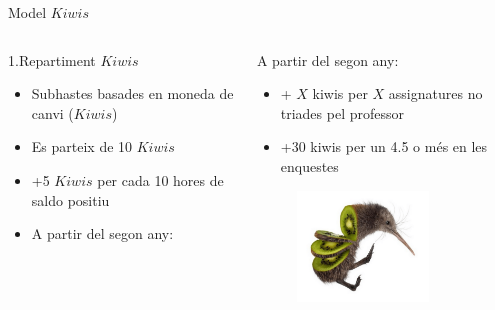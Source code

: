 \documentclass[twocolumn]{beamer}
\begin{document}
\begin{frame}{Model $Kiwis$}
\begin{columns}[t]
	\begin{column}{.5\textwidth}
		\begin{block}{1.Repartiment $Kiwis$}
			\begin{itemize}
				\item Subhastes basades en moneda de canvi ($Kiwis$)
				\item Es parteix de 10 $Kiwis$
				\item +5 $Kiwis$ per cada 10 hores de saldo positiu
				\item A partir del segon any:
			\end{itemize}
		\end{block}
	\end{column}
	\begin{column}{.5\textwidth}
		\begin{block}{A partir del segon any:}
			\begin{itemize}
				\footnotesize
				\item + $X$ kiwis per $X$ assignatures no triades pel professor
				\item +30 kiwis per un 4.5 o més en les enquestes
			\end{itemize}
		\end{block}
	\begin{figure}
		\centering
		\includegraphics[width=3.5cm]{kiwi}
	\end{figure}
	\end{column}
\end{columns}
\end{frame}
\end{document}

